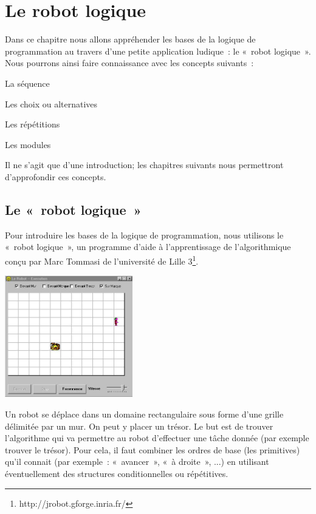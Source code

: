 \chapter{Le robot logique }

	Dans ce chapitre nous allons appréhender les bases de la logique de
	programmation au travers d'une petite application
	ludique~: le «~robot logique~». Nous pourrons ainsi faire connaissance
	avec les concepts suivants~:
	
	\begin{liste}
	\item La séquence
	\item Les choix ou alternatives
	\item Les répétitions
	\item Les modules
	\end{liste}

	Il ne s'agit que d'une introduction;
	les chapitres suivants nous permettront d'approfondir
	ces concepts.

\section{Le «~robot logique~»}

	Pour introduire les bases de la logique de programmation, nous utilisons
	le «~robot logique~», un programme d'aide à
	l'apprentissage de l'algorithmique conçu par Marc Tommasi
	de l'université de Lille
	3\footnote{http://jrobot.gforge.inria.fr/}.
	
	\begin{center}
	\includegraphics[width=5.553cm,height=5.302cm]{image/robot-grille}
	\end{center}
	
	Un robot se déplace dans un domaine rectangulaire sous 
	forme d'une grille délimitée par un mur.
	On peut y placer un trésor. Le but est de trouver
	l'algorithme qui va permettre au robot
	d'effectuer une tâche donnée (par exemple trouver le
	trésor). Pour cela, il faut combiner les ordres de base (les
	primitives) qu'il connait (par exemple~: «~avancer~»,
	«~à droite~», ...) en utilisant éventuellement des structures
	conditionnelles ou répétitives.


